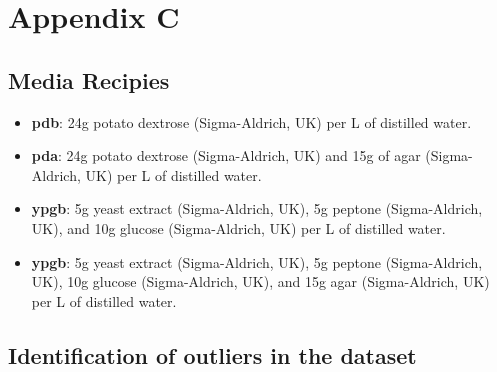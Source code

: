 \newpage
\section{Appendix C}
\subsection{Media Recipies}
\label{apx:mediaRecipies}

\begin{itemize}
    \item \textbf{\Acf{pdb}}: 24g potato dextrose (Sigma-Aldrich, UK) per L of distilled water.
    \item \textbf{\Acf{pda}}: 24g potato dextrose (Sigma-Aldrich, UK)  and 15g of agar (Sigma-Aldrich, UK) per L of distilled water.  
    \item \textbf{\Acf{ypgb}}: 5g yeast extract (Sigma-Aldrich, UK), 5g peptone (Sigma-Aldrich, UK), and 10g glucose  (Sigma-Aldrich, UK) per L of distilled water. 
    \item \textbf{\Acf{ypgb}}: 5g yeast extract (Sigma-Aldrich, UK), 5g peptone (Sigma-Aldrich, UK), 10g glucose (Sigma-Aldrich, UK), and 15g agar (Sigma-Aldrich, UK) per L of distilled water.
\end{itemize}

\newpage
\subsection{Identification of outliers in the dataset}
\label{apx:outliers}

